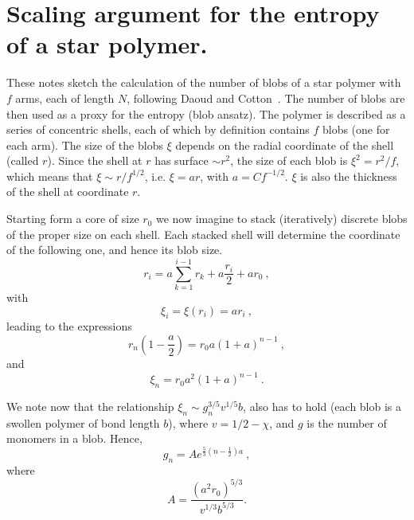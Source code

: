 \documentclass[
preprint,
a4paper,
12pt,
superscriptaddress,
pre]{revtex4}
\begin{document}
\section{Scaling argument for the entropy of a star polymer.}
\label{sec:scal-argum-entr}

These notes sketch the calculation of the number of blobs of a star
polymer with $f$ arms, each of length $N$, following Daoud and
Cotton~\cite{Daoud1982}. The number of blobs are then used as a proxy
for the entropy (blob ansatz).
The polymer is described as a series of concentric shells, each of
which by definition contains $f$ blobs (one for each arm). The size of
the blobs $\xi$ depends on the radial coordinate of the shell (called
$r$). Since the shell at $r$ has surface $\sim r^2$, the size of each
blob is $\xi^2 = r^2/f$, which means that $\xi \sim r / f^{1/2}$,
i.e. $\xi = a r$, with $a = C f^{-1/2} $.  $\xi$ is also the thickness
of the shell at coordinate $r$.

Starting form a core of size $r_0$ we now imagine to stack
(iteratively) discrete blobs of the proper size on each shell. Each
stacked shell will determine the coordinate of the following one, and
hence its blob size. 
\begin{displaymath}
  r_i = a \sum_{k=1}^{i-1} r_k + a \frac{r_i}{2} + a r_0 \ ,  
\end{displaymath}
with
\begin{displaymath}
  \xi_i = \xi(r_i) = a r_i \ ,
\end{displaymath}
%
%
leading to the expressions
\begin{displaymath}
  r_n \left(1 -\frac{a}{2} \right) = r_0 a (1+a)^{n-1} \ ,
\end{displaymath}
and
\begin{displaymath}
  \xi_n = r_0 a^2 (1+a)^{n-1} \ .
\end{displaymath}

We note now that the relationship $\xi_n \sim g_n^{3/5} v^{1/5} b$,
also has to hold (each blob is a swollen polymer of bond length $b$),
where $v=1/2 - \chi$, and $g$ is the number of monomers in a
blob. Hence,
\begin{displaymath}
  g_n = A e^{\frac{5}{3}\left(n-\frac{1}{2}\right)a} \ ,  
\end{displaymath}
where
\begin{displaymath}
 A= \frac{(a^2 r_0)^{5/3}}{v^{1/3} b^{5/3}} . 
\end{displaymath}
\end{document}
